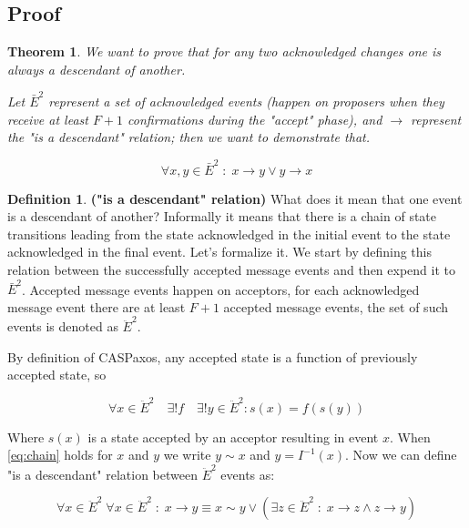 \documentclass[12pt]{article}
\newtheorem{theorem}{Theorem}
\theoremstyle{definition}
\newtheorem*{definition}{Definition}
\begin{document}
\begin{appendices}
\section{Proof}
\label{appendix:proof}

\begin{theorem} \label{th:proof}
  We want to prove that for any two acknowledged changes one is always a descendant of another.
  
  Let $\bar{E}^2$ represent a set of acknowledged events (happen on proposers when they receive at least $F+1$ confirmations during the "accept" phase), and $\to$ represent the "is a descendant" relation; then we want to demonstrate that.

  \begin{equation}
    \forall x,y \in \bar{E}^2 \;:\; x \to y \lor y \to x
  \end{equation}
\end{theorem}

\theoremstyle{definition}
\begin{definition}{\bf("is a descendant" relation)}
  What does it mean that one event is a descendant of another? Informally it means that there is a chain of state transitions leading from the state acknowledged in the initial event to the state acknowledged in the final event. Let's formalize it. We start by defining this relation between the successfully accepted message events and then expend it to $\bar{E}^2$. Accepted message events happen on acceptors, for each acknowledged message event there are at least $F+1$ accepted message events, the set of such events is denoted as $\ddot{E}^2$.

  By definition of CASPaxos, any accepted state is a function of previously accepted state, so
  
  \begin{equation} \label{eq:chain}
    \forall x \in \ddot{E}^2 \quad \exists ! f \quad \exists ! y \in \ddot{E}^2 : s(x) = f(s(y))
  \end{equation}
  
  Where $s(x)$ is a state accepted by an acceptor resulting in event $x$. When \ref{eq:chain} holds for $x$ and $y$ we write $y \sim x$ and $y = I^{-1}(x)$. Now we can define "is a descendant" relation between $\ddot{E}^2$ events as:
  
  \begin{equation}
    \forall x \in \ddot{E}^2 \; \forall x \in \ddot{E}^2 \;:\; x \to y \equiv x \sim y \lor (\exists z \in \ddot{E}^2 \;:\; x \to z \land z \to y)
  \end{equation}
  

\end{definition}
\end{appendices}
\end{document}
